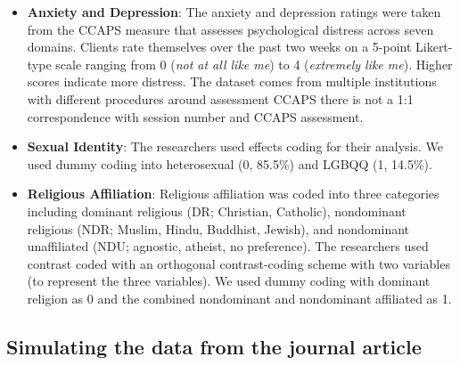 \documentclass[
  english,
]{book}
\begin{document}
\begin{itemize}
\item
  \textbf{Anxiety and Depression}: The anxiety and depression ratings were taken from the CCAPS measure \citep{locke_development_2012} that assesses psychological distress across seven domains. Clients rate themselves over the past two weeks on a 5-point Likert-type scale ranging from 0 (\emph{not at all like me}) to 4 (\emph{extremely like me}). Higher scores indicate more distress. The dataset comes from multiple institutions with different procedures around assessment CCAPS there is not a 1:1 correspondence with session number and CCAPS assessment.
\item
  \textbf{Sexual Identity}: The researchers used effects coding for their analysis. We used dummy coding into heterosexual (0, 85.5\%) and LGBQQ (1, 14.5\%).
\item
  \textbf{Religious Affiliation}: Religious affiliation was coded into three categories including dominant religious (DR; Christian, Catholic), nondominant religious (NDR; Muslim, Hindu, Buddhist, Jewish), and nondominant unaffiliated (NDU; agnostic, atheist, no preference). The researchers used contrast coded with an orthogonal contrast-coding scheme with two variables (to represent the three variables). We used dummy coding with dominant religion as 0 and the combined nondominant and nondominant affiliated as 1.
\end{itemize}

\hypertarget{simulating-the-data-from-the-journal-article-2}{%
\subsection{Simulating the data from the journal article}\label{simulating-the-data-from-the-journal-article-2}}
\end{document}
